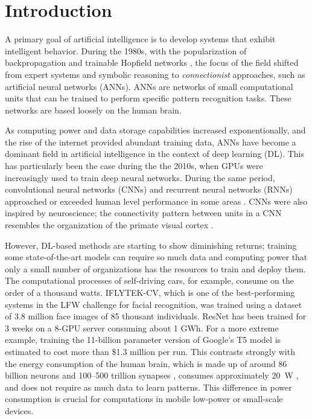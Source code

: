 \chapter{Introduction}\label{ch:introduction}

A primary goal of artificial intelligence is to develop systems that exhibit intelligent behavior.
During the 1980s, with the popularization of backpropagation \citep{rumelhart1986learning} and trainable Hopfield networks \citep{hopfield1982neural}, the focus of the field shifted from expert systems and symbolic reasoning to \emph{connectionist} approaches, such as artificial neural networks (ANNs).
ANNs are networks of small computational units that can be trained to perform specific pattern recognition tasks.
These networks are based loosely on the human brain.

As computing power and data storage capabilities increased exponentionally, and the rise of the internet provided abundant training data, ANNs have become a dominant field in artificial intelligence in the context of deep learning (DL).
This has particularly been the case during the the 2010s, when GPUs were increasingly used to train deep neural networks.
During the same period, convolutional neural networks (CNNs) and recurrent neural networks (RNNs) approached or exceeded human level performance in some areas \citep{schmidhuber2015deep}.
CNNs were also inspired by neuroscience; the connectivity pattern between units in a CNN resembles the organization of the primate visual cortex \citep{hubel1968receptive}.

However, DL-based methods are starting to show diminishing returns; training some state-of-the-art models can require so much data and computing power that only a small number of organizations has the resources to train and deploy them.
The computational processes of self-driving cars, for example, consume on the order of a thousand watts.
IFLYTEK-CV, which is one of the best-performing systems in the LFW challenge for facial recognition, was trained using a dataset of 3.8 million face images of 85 thousant individuals.
ResNet has been trained for 3 weeks on a 8-GPU server  consuming about 1 GWh.
For a more extreme example, training the 11-billion parameter version of Google's T5 model \citep{raffel2019exploring} is estimated to cost more than \$1.3 million per run\citep{sharir2020cost}.
This contrasts strongly with the energy consumption of the human brain, which is made up of around 86 billion neurons \citep{azevedo2009equal} and 100--500 trillion synapses \citep{drachman2005we}, consumes approximately \SI{20}{\watt} \citep{sokoloff1960metabolism,drubach2000brain}, and does not require as much data to learn patterns.
This difference in power consumption is crucial for computations in mobile low-power or small-scale devices.

